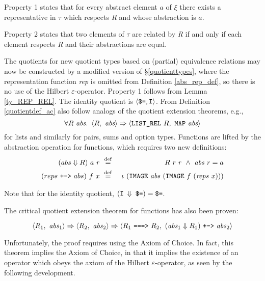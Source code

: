 \documentclass[envcountsame,runningheads]{llncs}
\def\defeq{\stackrel{\mathrm{def}}{=}}
\newcommand{\repofabs}{\Downarrow}
\begin{document}
Property 1 states that for every abstract element $a$ of $\xi$
there exists a representative in $\tau$ which respects {\it R\/} and whose abstraction is $a$.

Property 2 states that two elements of $\tau$ are related by {\it R\/}
if and only if
each element respects {\it R\/} and their abstractions are equal.

The quotients for new quotient types
based on (partial) equivalence relations may now be
constructed by a modified version of \S \ref{quotienttypes},
where the representation function {\it rep\/} is omitted
from Definition \ref{abs_rep_def}, so there is no
use of the Hilbert $\varepsilon$-operator.
Property 1 follows from Lemma \ref{ty_REP_REL}.
%
The identity quotient is
$\langle \mbox{\tt \$=},\mbox{\tt I} \rangle$.
From Definition \ref{quotientdef_ac}
also follow analogs of the quotient extension theorems, e.g.,
$$
\forall R\ \mbox{\it abs}.\ \,
\langle R,\ \mbox{\it abs} \rangle \Rightarrow
\langle \mbox{\tt LIST\_REL}\ R,\ \mbox{\tt MAP}\ \mbox{\it abs} \rangle$$
\noindent
for lists
and similarly for pairs, sums and option types.
Functions are lifted by
the abstraction operation for functions, which requires two new definitions:
\begin{eqnarray*}
(abs \repofabs R) \ a \ r \ & \defeq & \
R\ r\ r\ \wedge \ {\it abs}\ r = a
\\
(reps \ \mbox{\tt +->} \ abs) \ f \ x \ & \defeq & \
\iota \ ({\tt IMAGE}\ {\it abs}\ ({\tt IMAGE}\ f\ ({\it reps}\ x)))
\end{eqnarray*}
%
\begin{comment}
\begin{eqnarray*}
abs \repofabs R \ & \defeq & \
\lambda a{\mbox{\tt :}\xi}.\
\lambda r{\mbox{\tt :}\tau}.\
R\ r\ r\ \wedge \ {\it abs}\ r = a
\\
rep \ \mbox{\tt +->} \ abs \ & \defeq & \
\lambda f
.\ \lambda x.\
\iota \ ({\tt IMAGE}\ {\it abs}\ ({\tt IMAGE}\ f\ ({\it rep}\ x)))
\end{eqnarray*}
\end{comment}

\noindent
Note that for the identity quotient, $(\mbox{\tt I $\repofabs$ \$=}) = \mbox{\tt \$=}$.

The critical quotient extension
theorem for functions has also been proven:
\begin{theorem}[Function quotient extension]
\label{functionquotient}
$$
  \langle R_1,\ {\it abs}_1 \rangle \Rightarrow
  \langle R_2,\ {\it abs}_2 \rangle \Rightarrow
\langle R_1 \ \mbox{\tt ===>} \ R_2,\
  ({\it abs}_1 \repofabs R_1) \ \mbox{\tt +->} \ {\it abs}_2 \rangle$$
\end{theorem}
\noindent
Unfortunately, the proof requires using the Axiom of Choice.
In fact, this theorem implies the Axiom of Choice, in that it implies
the existence of an operator which obeys the axiom of the
Hilbert $\varepsilon$-operator, as seen by the following development.
\end{document}
